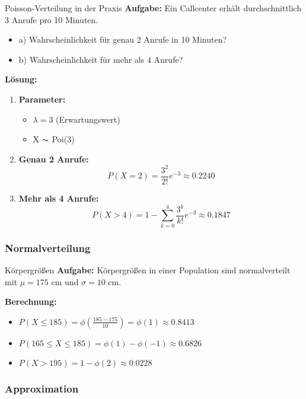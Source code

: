 \begin{example2}{Poisson-Verteilung in der Praxis}
\textbf{Aufgabe:} Ein Callcenter erhält durchschnittlich 3 Anrufe pro 10 Minuten.
\begin{itemize}
\item a) Wahrscheinlichkeit für genau 2 Anrufe in 10 Minuten?
\item b) Wahrscheinlichkeit für mehr als 4 Anrufe?
\end{itemize}

\textbf{Lösung:}
\begin{enumerate}
\item \textbf{Parameter:}
   \begin{itemize}
   \item $\lambda = 3$ (Erwartungswert)
   \item X $\thicksim$ Poi(3)
   \end{itemize}

\item \textbf{Genau 2 Anrufe:}
   $$P(X=2) = \frac{3^2}{2!}e^{-3} \approx 0.2240$$ 

\item \textbf{Mehr als 4 Anrufe:}
   $$P(X>4) = 1 - \sum_{k=0}^4 \frac{3^k}{k!}e^{-3} \approx 0.1847$$
\end{enumerate}
\end{example2}

\subsubsection{Normalverteilung}

\begin{example2}{Körpergrößen}
\textbf{Aufgabe:} Körpergrößen in einer Population sind normalverteilt mit $\mu = 175$ cm und $\sigma = 10$ cm.

\textbf{Berechnung:}
\begin{itemize}
\item $P(X \leq 185) = \phi(\frac{185-175}{10}) = \phi(1) \approx 0.8413$
\item $P(165 \leq X \leq 185) = \phi(1) - \phi(-1) \approx 0.6826$
\item $P(X > 195) = 1 - \phi(2) \approx 0.0228$
\end{itemize}
\end{example2}

\subsubsection{Approximation}

